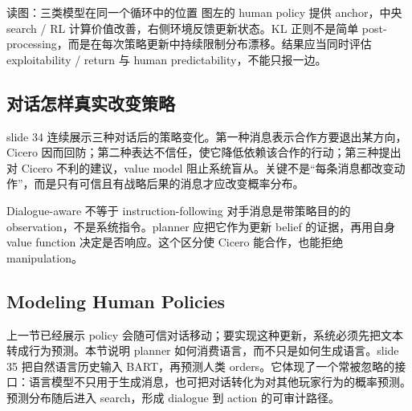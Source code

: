 
\begin{knowledgebox}{读图：三类模型在同一个循环中的位置}
图左的 human policy 提供 anchor，中央 search / RL 计算价值改善，右侧环境反馈更新状态。KL 正则不是简单 post-processing，而是在每次策略更新中持续限制分布漂移。结果应当同时评估 exploitability / return 与 human predictability，不能只报一边。
\end{knowledgebox}


\subsection{对话怎样真实改变策略}

slide 34 连续展示三种对话后的策略变化。第一种消息表示合作方要退出某方向，Cicero 因而回防；第二种表达不信任，使它降低依赖该合作的行动；第三种提出对 Cicero 不利的建议，value model 阻止系统盲从。关键不是“每条消息都改变动作”，而是只有可信且有战略后果的消息才应改变概率分布。


\begin{importantbox}{Dialogue-aware 不等于 instruction-following}
对手消息是带策略目的的 observation，不是系统指令。planner 应把它作为更新 belief 的证据，再用自身 value function 决定是否响应。这个区分使 Cicero 能合作，也能拒绝 manipulation。
\end{importantbox}

\subsection{Modeling Human Policies}

上一节已经展示 policy 会随可信对话移动；要实现这种更新，系统必须先把文本转成行为预测。本节说明 planner 如何消费语言，而不只是如何生成语言。slide 35 把自然语言历史输入 BART，再预测人类 orders。它体现了一个常被忽略的接口：语言模型不只用于生成消息，也可把对话转化为对其他玩家行为的概率预测。预测分布随后进入 search，形成 dialogue 到 action 的可审计路径。

